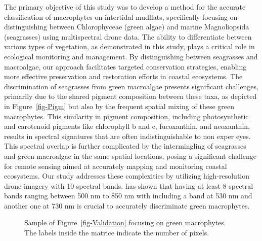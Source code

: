 \documentclass[
  number]{elsarticle}
\begin{document}
The primary objective of this study was to develop a method for the
accurate classification of macrophytes on intertidal mudflats,
specifically focusing on distinguishing between Chlorophyceae (green
algae) and marine Magnoliopsida (seagrasses) using multispectral drone
data. The ability to differentiate between various types of vegetation,
as demonstrated in this study, plays a critical role in ecological
monitoring and management. By distinguishing between seagrasses and
macroalgae, our approach facilitates targeted conservation strategies,
enabling more effective preservation and restoration efforts in coastal
ecosystems. The discrimination of seagrasses from green macroalgae
presents significant challenges, primarily due to the shared pigment
composition between these taxa, as depicted in Figure~\ref{fig-Pigm} but
also by the frequent spatial mixing of these green macrophytes. This
similarity in pigment composition, including photosynthetic and
carotenoid pigments like chlorophyll b and c, fucoxanthin, and
neoxanthin, results in spectral signatures that are often
indistinguishable to non exper eyes. This spectral overlap is further
complicated by the intermingling of seagrasses and green macroalgae in
the same spatial locations, posing a significant challenge for remote
sensing aimed at accurately mapping and monitoring coastal ecosystems.
Our study addresses these complexities by utilizing high-resolution
drone imagery with 10 spectral bands. \citep{Davies2023} has shown that
having at least 8 spectral bands ranging between 500 nm to 850 nm with
including a band at 530 nm and another one at 730 nm is crucial to
accurately discriminate green macrophytes.

\label{cell-fig-ValidationGreen}
\begin{figure}[H]


\caption{\label{fig-ValidationGreen}Sample of
Figure~\ref{fig-Validation} focusing on green macrophytes. The labels
inside the matrice indicate the number of pixels.}

\end{figure}%
\end{document}
